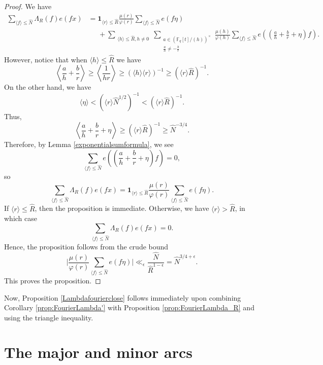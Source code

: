 \documentclass{article}
\theoremstyle{definition}
\theoremstyle{definition}
\theoremstyle{remark}
\newcommand{\F}{\mathbb{F}_q[t]}
\renewcommand\phi\varphi
\newcommand{\1}{\mathbf{1}}
\numberwithin{equation}{section}
\begin{document}
\begin{proof}

We have 
\begin{align*}
\sum_{\langle f\rangle\leq \widehat{N}} \Lambda_{R}(f)e(fx)&= \mathbf{1}_{\langle r\rangle  \leq \widehat{R}}\frac{\mu(r)}{\phi(r)} \sum_{\langle f\rangle\leq \widehat{N}} e(f\eta)\\
&\;\;\;\;\;+ \sum_{\substack{\langle h \rangle  \leq \widehat{R}, h\neq 0}}\sum_{\substack{a \in (\F\slash (h))^\times\\ \frac{a}{h} \neq -\frac{b}{r}}} \frac{\mu(h)}{\phi(h)} \sum_{\langle f\rangle\leq \widehat{N}} e\left( \left( \frac{a}{h} + \frac{b}{r} + \eta \right)f \right).
\end{align*}
However, notice that when $\langle h\rangle \leq \widehat{R}$ we have 
\[\left\langle \frac{a}{h}+\frac{b}{r}\right\rangle \geq \left\langle \frac{1}{hr}\right\rangle \geq (\langle h\rangle \langle r\rangle)^{-1}\geq (\langle r\rangle\widehat{R})^{-1}.\]
On the other hand, we have 
\[\langle \eta \rangle < (\langle r\rangle\widehat{N}^{1\slash 2})^{-1}<(\langle r\rangle\widehat{R})^{-1}.\]
Thus, 
\[\left\langle \frac{a}{h} + \frac{b}{r} + \eta \right\rangle \geq (\langle r\rangle\widehat{R})^{-1}\geq \widehat{N}^{-3\slash 4}.\]
Therefore, by Lemma \ref{exponentialsumformula}, we see 
\[ \sum_{\langle f\rangle\leq \widehat{N}} e\left( \left( \frac{a}{h} + \frac{b}{r} + \eta \right)f\right)=0,\]
so
\[\sum_{\langle f\rangle\leq \widehat{N}} \Lambda_{R}(f)e(fx)= \mathbf{1}_{\langle r\rangle  \leq \widehat{R}}\frac{\mu(r)}{\phi(r)} \sum_{\langle f\rangle\leq \widehat{N}} e(f\eta).\]
If $\langle r \rangle \leq \widehat{R}$, then the proposition is immediate. Otherwise, we have $\langle r \rangle >\widehat{R}$, in which case 
\[\sum_{\langle f\rangle\leq \widehat{N}} \Lambda_{R}(f)e(fx)=0.\]
Hence, the proposition follows from the crude bound 
\[\Bigg|\frac{\mu(r)}{\phi(r)} \sum_{\langle f\rangle\leq \widehat{N}} e(f\eta)\Bigg|\ll_\epsilon \frac{\widehat{N}}{\widehat{R}^{1-\epsilon}}=\widehat{N}^{3\slash 4+\epsilon}.\]
This proves the proposition.
\end{proof}

Now, Proposition \ref{Lambdafourierclose} follows immediately upon combining Corollary \ref{prop:FourierLambda'} with Proposition \ref{prop:FourierLambda_R} and using the triangle inequality.

\section{The major and minor arcs}
\end{document}
